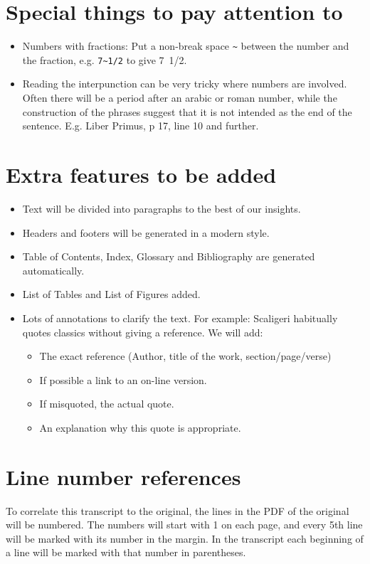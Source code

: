 \documentclass{report}
\begin{document}
\section{Special things to pay attention to}
\begin{itemize}
\item Numbers with fractions: Put a non-break space \verb+~+ between the number
and the fraction, e.g. \verb+7~1/2+ to give 7~1/2.
\item Reading the interpunction can be very tricky where numbers are involved.
Often there will be a period after an arabic or roman number, while the
construction of the phrases suggest that it is not intended as the end of 
the sentence. E.g. Liber Primus, p 17, line 10 and further.
\end{itemize}

\section{Extra features to be added}
\begin{itemize}
\item Text will be divided into paragraphs to the best of our insights.
\item Headers and footers will be generated in a modern style.
\item Table of Contents, Index, Glossary and Bibliography are generated
automatically.
\item List of Tables and List of Figures added.
\item Lots of annotations to clarify the text.
For example: Scaligeri habitually quotes classics without giving a reference.
We will add:
    \begin{itemize}
    \item The exact reference (Author, title of the work, section/page/verse)
    \item If possible a link to an on-line version.
    \item If misquoted, the actual quote.
    \item An explanation why this quote is appropriate.
    \end{itemize}
\end{itemize}

\section{Line number references}
To correlate this transcript to the original,  the lines
in the PDF of the original will be numbered.
The numbers will start with 1 on each page, and every 5th line will be marked
with its number in the margin.
In the transcript each beginning of a line will be marked with that number
in parentheses.
\end{document}
